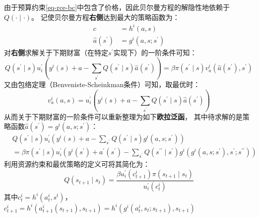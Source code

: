 由于预算约束\ref{eq-rce-bc}中包含了价格，因此贝尔曼方程的解隐性地依赖于$Q\left(\cdot\mid\cdot\right)$。
记使贝尔曼方程\textbf{右侧}达到最大的策略函数为：
\begin{subequations}
    \begin{align}
        c & =h^i(a, s) \\
        \hat{a}\left(s^{\prime}\right) & =g^i\left(a, s; s^{\prime}\right)
    \end{align}
\end{subequations}
对\textbf{右侧}求解关于下期财富（在特定$s^{\prime}$实现下）的一阶条件可知：
\begin{equation*}
    Q\left(s^{\prime}\mid s\right)u_i^{\prime}\left(y^i\left(s\right) + a
        -\sum_{s^{\prime}}Q\left(s^{\prime}\mid s\right)\hat{a}\left(s^{\prime}\right)\right)
        = \beta \pi\left(s^{\prime}\mid s\right) v_a^i\left(\hat{a}\left(s^{\prime}\right), s^{\prime}\right)
\end{equation*}
又由包络定理（Benveniste-Scheinkman条件）可知，取最优时：
\begin{equation*}
    v_a^i\left(a,s\right) = u_i^{\prime}\left(y^i\left(s\right) + a
                                -\sum_{s^{\prime}}Q\left(s^{\prime}\mid s\right)\hat{a}\left(s^{\prime}\right)\right)
\end{equation*}
从而关于下期财富的一阶条件可以重新整理为如下\textbf{欧拉泛函}，
其中待求解的是策略函数$\hat{a}\left(s^{\prime}\right)=g^i\left(a,s;s^{\prime}\right)$：
\begin{equation}    \label{eq-rce-euler1}
    \begin{aligned}
        &Q\left(s^{\prime}\mid s\right) u_i^{\prime}\left(y^i\left(s\right) + a 
        - \sum_{s^{\prime}}Q\left(s^{\prime}\mid s\right)g^i\left(a,s;s^{\prime}\right)\right) \\
            &= \beta \pi\left(s^{\prime}\mid s\right)
                u_i^{\prime}\left(y^i\left(s^{\prime}\right) + a^{\prime}\left(s^{\prime}\right)
                    -\sum_{s^{\prime}}Q\left(s^{\prime\prime}\mid s^{\prime}\right)
                        g^i\left(g^i\left(a,s;s^{\prime}\right),s^{\prime};s^{\prime\prime}\right)\right)
    \end{aligned}
\end{equation}
利用资源约束和最优策略的定义可将其简化为：
\begin{equation}    \label{eq-rce-euler2}
    Q\left(s_{t+1} \mid s_t\right)
        =\frac{\beta u_i^{\prime}\left(c_{t+1}^i\right)\pi\left(s_{t+1}\mid s_t\right)}{u_i^{\prime}\left(c_t^i\right)}
\end{equation}
其中$c_t^i=h^i\left(a_t^i,s^t\right)$，
$c_{t+1}^i=h^i\left(a_{t+1}^i\left(s_{t+1}\right),s_{t+1}\right)=h^i\left(g^i\left(a_t^i,s_t;s_{t+1}\right),s_{t+1}\right)$

